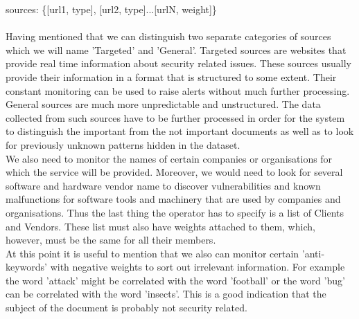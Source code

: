\documentclass[12pt]{article}
\begin{document}
sources: \{[url1, type], [url2, type]...[urlN, weight]\}\\\\
Having mentioned that we can distinguish two separate categories of sources which we will name 'Targeted' and 'General'. Targeted sources are websites that provide real time information about security related issues. These sources usually provide their information in a format that is structured to some extent. Their constant monitoring can be used to raise alerts without much further processing.
\hfill \break \\
General sources are much more unpredictable and unstructured. The data collected from such sources have to be further processed in order for the system to distinguish the important from the not important documents as well as to look for previously unknown patterns hidden in the dataset. 
\hfill \break \\
We also need to monitor the names of certain companies or organisations for which the service will be provided. Moreover, we would need to look for several software and hardware vendor name to discover vulnerabilities and known malfunctions for software tools and machinery that are used by companies and organisations. Thus the last thing the operator has to specify is a list of Clients and Vendors. These list must also have weights attached to them, which, however, must be the same for all their members. 
\hfill \break \\
At this point it is useful to mention that we also can monitor certain 'anti-keywords' with negative weights to sort out irrelevant information. For example the word 'attack' might be correlated with the word 'football' or the word 'bug' can be correlated with the word 'insects'. This is a good indication that the subject of the document is probably not security related. 

\end{document}

